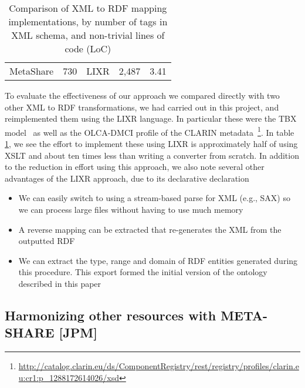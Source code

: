 \documentclass{llncs}
\begin{document}
{\begin{table}
\begin{center}
\begin{tabular}{p{4cm}|cccc}
MetaShare & 730 & LIXR & 2,487 & 3.41 \\
\end{tabular}
\end{center}
\caption{\label{tab:locs}Comparison of XML to RDF mapping implementations,
by number of tags in XML schema, and non-trivial lines of code (LoC)}
\end{table}
To evaluate the effectiveness of our approach we compared directly with two other
XML to RDF transformations, we had carried out in this project, and
reimplemented them using the LIXR language. In particular these were the TBX
model~\cite{iso30042} as well as the OLCA-DMCI profile of the CLARIN
metadata~\footnote{\url{http://catalog.clarin.eu/ds/ComponentRegistry/rest/registry/profiles/clarin.eu:cr1:p\_1288172614026/xsd}}. In table \ref{tab:locs}, we see the
effort to implement these using LIXR is approximately half of using XSLT and
about ten times less than writing a converter from scratch.
In addition to the reduction in effort using this approach, we also note several
other advantages of the LIXR approach, due to its declarative declaration
\begin{itemize}
\item We can easily switch to using a stream-based parse for XML (e.g., SAX)
so we can process large files without having to use much memory
\item A reverse mapping can be extracted that re-generates the XML from the
outputted RDF
\item We can extract the type, range and domain of RDF entities generated
during this procedure. This export formed the initial version of the
ontology described in this paper
\end{itemize}

\subsection{Harmonizing other resources with META-SHARE [JPM]}
\label{sec:harmonization}

}
\end{document}

